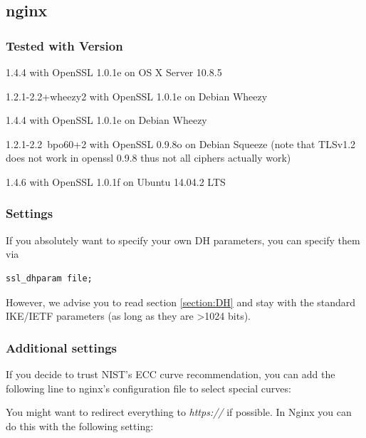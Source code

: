 \subsection{nginx}

\subsubsection{Tested with Version}
\begin{itemize*}
  \item 1.4.4 with OpenSSL 1.0.1e on OS X Server 10.8.5
  \item 1.2.1-2.2+wheezy2 with OpenSSL 1.0.1e on Debian Wheezy
  \item 1.4.4 with OpenSSL 1.0.1e on Debian Wheezy
  \item 1.2.1-2.2~bpo60+2 with OpenSSL 0.9.8o on Debian Squeeze (note that TLSv1.2 does not work in openssl 0.9.8 thus not all ciphers actually work)
  \item 1.4.6 with OpenSSL 1.0.1f on Ubuntu 14.04.2 LTS
\end{itemize*}


\subsubsection{Settings}
If you absolutely want to specify your own DH parameters, you can specify them via

\begin{lstlisting}
ssl_dhparam file;
\end{lstlisting}

However, we advise you to read section \ref{section:DH} and stay with the standard IKE/IETF parameters (as long as they are \textgreater 1024 bits).

\subsubsection{Additional settings}
If you decide to trust NIST's ECC curve recommendation, you can add the following line to nginx's configuration file to select special curves:


You might want to redirect everything to \emph{https://} if possible. In Nginx you can do this with the following setting:


